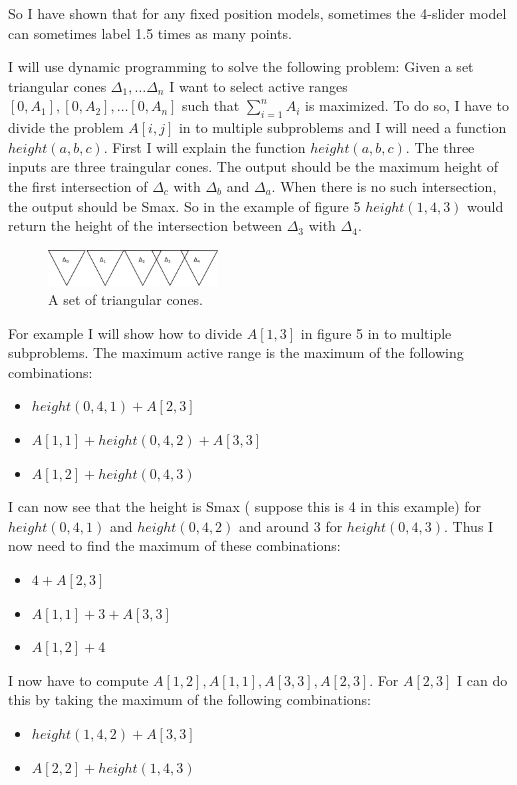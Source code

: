 \documentclass[a4paper,twoside,11pt]{article}
\newcommand{\exercise}[1]{\noindent{\bf Exercise #1:}}
\begin{document}
So I have shown that for any fixed position models, sometimes the 4-slider model  can sometimes label 1.5 times as many points. 

\bigskip

\exercise{2} 
I will use dynamic programming to solve the following problem:  Given a set  triangular cones $\Delta_1, \ldots \Delta_n$ I want to select active ranges $[0,A_1], [0,A_2], \ldots [0,A_n]$ such that $\sum_{i=1}^n A_i$ is maximized.
To do so, I have to divide the problem $A[i,j]$ in to multiple subproblems and I will need a function $height(a,b,c)$. 
First I will explain the function $height(a,b,c)$. The three inputs are three traingular cones. 
The output should be the maximum height of the first intersection of  $\Delta_c$ with $\Delta_b$ and $\Delta_a$. When there is no such intersection, the output should be Smax. 
So in the example of figure 5 $height(1,4,3)$ would return the height of the intersection between $\Delta_3$ with $\Delta_4$. 
 \begin{figure}[H]
	\centering
	\includegraphics[width=0.4\textwidth]{A42a.png}
	\caption{A set of triangular cones.}
\end{figure}
For example I will show how to divide $A[1,3]$ in figure 5 in to multiple subproblems.
The maximum active range is the maximum of the following combinations: 
\begin{itemize}
\item $ height(0,4,1) + A[2,3]$
\item $A[1,1] + height(0,4,2) +  A[3,3]$
\item $A[1,2] + height(0,4,3) $
\end{itemize} 
I can now  see that the height is Smax ( suppose this is 4 in this example) for $height(0,4,1)$  and $ height(0,4,2)$ and around 3 for $height(0,4,3)$. 
Thus I now need to find the maximum of these combinations: 
\begin{itemize}
\item $4 + A[2,3]$
\item $A[1,1] +  3 +  A[3,3]$
\item $A[1,2] +  4$
\end{itemize} 
I now have to compute $A[1,2], A[1,1], A[3,3], A[2,3]$. 
For $A[2,3]$ I can do this by taking the maximum of the following combinations: 
\begin{itemize}
\item $ height(1,4,2) + A[3,3]$
\item $A[2,2] + height(1,4,3)$
\end{itemize} 
\end{document}
